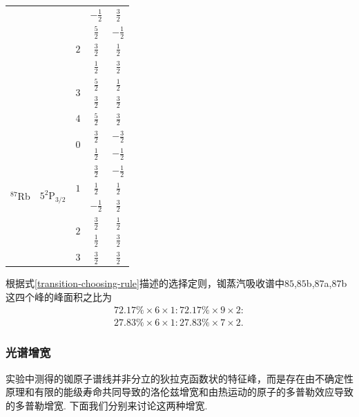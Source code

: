 \documentclass[a4paper, 10pt]{article}
\begin{document}
\begin{multicols*}{2}
\begin{table}[H]
\begin{tabular}{|c|c|c|c|c|}
        &  &  & $-\frac{1}{2}$ & $\frac{3}{2}$ \\ \cline{3-5} 
        &  & \multirow{3}{*}{$2$} & $\frac{5}{2}$ & $-\frac{1}{2}$ \\ \cline{4-5} 
        &  &  & $\frac{3}{2}$ & $\frac{1}{2}$ \\ \cline{4-5} 
        &  &  & $\frac{1}{2}$ & $\frac{3}{2}$ \\ \cline{3-5} 
        &  & \multirow{2}{*}{$3$} & $\frac{5}{2}$ & $\frac{1}{2}$ \\ \cline{4-5} 
        &  &  & $\frac{3}{2}$ & $\frac{3}{2}$ \\ \cline{3-5} 
        &  & $4$ & $\frac{5}{2}$ & $\frac{3}{2}$ \\ \hline
    \multirow{8}{*}{$^{87}$Rb} & \multirow{8}{*}{$5^2$P$_{3/2}$} & \multirow{2}{*}{$0$} & $\frac{3}{2}$ & $-\frac{3}{2}$ \\ \cline{4-5} 
        &  &  & $\frac{1}{2}$ & $-\frac{1}{2}$ \\ \cline{3-5} 
        &  & \multirow{3}{*}{$1$} & $\frac{3}{2}$ & $-\frac{1}{2}$ \\ \cline{4-5} 
        &  &  & $\frac{1}{2}$ & $\frac{1}{2}$ \\ \cline{4-5} 
        &  &  & $-\frac{1}{2}$ & $\frac{3}{2}$ \\ \cline{3-5} 
        &  & \multirow{2}{*}{$2$} & $\frac{3}{2}$ & $\frac{1}{2}$ \\ \cline{4-5} 
        &  &  & $\frac{1}{2}$ & $\frac{3}{2}$ \\ \cline{3-5} 
        &  & $3$ & $\frac{3}{2}$ & $\frac{3}{2}$ \\ \hline
    \end{tabular}
\end{table}

根据式\eqref{transition-choosing-rule}描述的选择定则，铷蒸汽吸收谱中$85$,$85$b,$87$a,$87$b这四个峰的峰面积之比为
\begin{gather*}
    72.17\%\times 6\times 1:72.17\%\times 9\times 2:\\
    27.83\%\times 6\times 1:27.83\%\times 7\times 2.
\end{gather*}

\subsubsection{光谱增宽}
实验中测得的铷原子谱线并非分立的狄拉克函数状的特征峰，而是存在由不确定性原理和有限的能级寿命共同导致的洛伦兹增宽和由热运动的原子的多普勒效应导致的多普勒增宽. 下面我们分别来讨论这两种增宽.


\end{multicols*}
\end{document}
